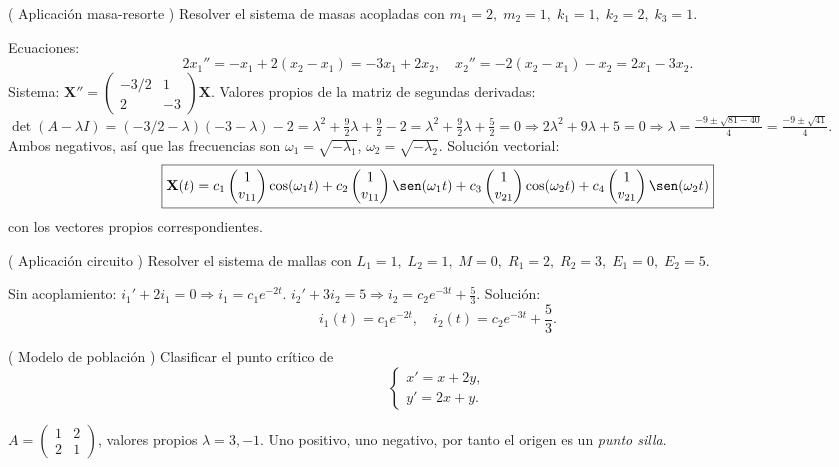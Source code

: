 \begin{prob}
( Aplicación masa-resorte ) Resolver el sistema de masas acopladas con $m_1=2,\; m_2=1,\; k_1=1,\; k_2=2,\; k_3=1$.
\begin{myproof}
Ecuaciones:
\[
2x_1''= -x_1+2(x_2-x_1)= -3x_1+2x_2,\quad x_2''=-2(x_2-x_1)-x_2=2x_1-3x_2.
\]
Sistema: $\mathbf{X}''=
\begin{pmatrix}
-3/2&1\\
2&-3
\end{pmatrix}\mathbf{X}$.
Valores propios de la matriz de segundas derivadas: $\det(A-\lambda I)=(-3/2-\lambda)(-3-\lambda)-2 = \lambda^2+\frac92\lambda+\frac{9}{2}-2 = \lambda^2+\frac92\lambda+\frac52=0\Rightarrow 2\lambda^2+9\lambda+5=0\Rightarrow \lambda=\frac{-9\pm\sqrt{81-40}}{4}=\frac{-9\pm\sqrt{41}}{4}$.
Ambos negativos, así que las frecuencias son $\omega_1=\sqrt{-\lambda_1}$, $\omega_2=\sqrt{-\lambda_2}$. Solución vectorial:
\[
\boxed{
\mathbf{X}(t)=c_1
\begin{pmatrix}
1\\ v_{11}
\end{pmatrix}\cos(\omega_1 t)+c_2
\begin{pmatrix}
1\\ v_{11}
\end{pmatrix}\sen(\omega_1 t)
+c_3
\begin{pmatrix}
1\\ v_{21}
\end{pmatrix}\cos(\omega_2 t)+c_4
\begin{pmatrix}
1\\ v_{21}
\end{pmatrix}\sen(\omega_2 t)
}
\]
con los vectores propios correspondientes.
\end{myproof}
\end{prob}

\begin{prob}
( Aplicación circuito ) Resolver el sistema de mallas con $L_1=1,\; L_2=1,\; M=0,\; R_1=2,\; R_2=3,\; E_1=0,\; E_2=5$.
\begin{myproof}
Sin acoplamiento: $i_1'+2i_1=0\Rightarrow i_1=c_1 e^{-2t}$. $i_2'+3i_2=5\Rightarrow i_2=c_2 e^{-3t}+\frac53$.
Solución:
\[
\boxed{
i_1(t)=c_1 e^{-2t},\quad i_2(t)=c_2 e^{-3t}+\frac53.
}
\]
\end{myproof}
\end{prob}

\begin{prob}
( Modelo de población ) Clasificar el punto crítico de
\[
\begin{cases}
x'=x+2y,\\
y'=2x+y.
\end{cases}
\]
\begin{myproof}
$A=
\begin{pmatrix}
1&2\\
2&1
\end{pmatrix}$, valores propios $\lambda=3,-1$. Uno positivo, uno negativo, por tanto el origen es un \emph{punto silla}.
\end{myproof}
\end{prob}

